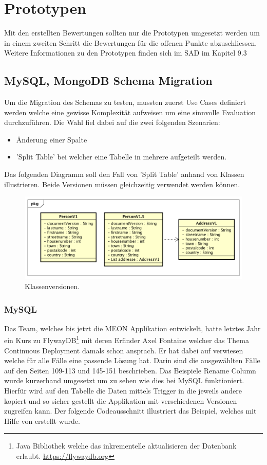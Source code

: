 \section{Prototypen}

Mit den erstellten Bewertungen sollten nur die Prototypen umgesetzt werden um in einem zweiten Schritt die Bewertungen für die offenen Punkte abzuschliessen. Weitere Informationen zu den Prototypen finden sich im SAD im Kapitel 9.3

\subsection{MySQL, MongoDB Schema Migration}

Um die Migration des Schemas zu testen, mussten zuerst Use Cases definiert werden welche eine gewisse Komplexität aufweisen um eine sinnvolle Evaluation durchzuführen. Die Wahl fiel dabei auf die zwei folgenden Szenarien:
\begin{itemize}
	\item Änderung einer Spalte
	\item 'Split Table' bei welcher eine Tabelle in mehrere aufgeteilt werden.
\end{itemize}
Das folgenden Diagramm soll den Fall von 'Split Table' anhand von Klassen illustrieren. Beide Versionen müssen gleichzeitig verwendet werden können.
\begin{figure}[H]
	\centering
	\includegraphics[scale=0.65]{ClassMigrationVersionThesis.png}\newline
	\caption{Klassenversionen.}
\end{figure}
\newpage
\subsubsection{MySQL}

Das Team, welches bis jetzt die MEON Applikation entwickelt, hatte letztes Jahr ein Kurs zu FlywayDB\footnote{Java Bibliothek welche das inkrementelle aktualisieren der Datenbank erlaubt. \url{https://flywaydb.org}} mit deren Erfinder Axel Fontaine  welcher das Thema Continuous Deployment damals schon ansprach. Er hat dabei auf \cite{rd} verwiesen welche für alle Fälle eine passende Lösung hat. Darin sind die ausgewählten Fälle auf den Seiten 109-113 und 145-151 beschrieben. Das Beispiele Rename Column wurde kurzerhand umgesetzt um zu sehen wie dies bei MySQL funktioniert. Hierfür wird auf den Tabelle die Daten mittels Trigger in die jeweils andere kopiert und so sicher gestellt die Applikation mit verschiedenen Versionen zugreifen kann. Der folgende Codeausschnitt illustriert das Beispiel, welches mit Hilfe von \cite{mysqltrigger} erstellt wurde.

